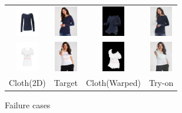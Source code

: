 \begin{figure}[t]
   \centering
\begin{tabular}{cccc}

\includegraphics[width=1cm]{figures/c2dw/000118_1.png}&
\includegraphics[width=1cm]{figures/image/000118_0.jpg}&
\includegraphics[width=1cm]{figures/c3dwfull/000118_1_000118_0.png}&
\includegraphics[width=1cm]{figures/try-on/000118_1_000118_0.jpg}\\

\includegraphics[width=1cm]{figures/c2dw/004508_1.png}&
\includegraphics[width=1cm]{figures/image/004508_0.jpg}&
\includegraphics[width=1cm]{figures/c3dwfull/004508_1_004508_0.png}&
\includegraphics[width=1cm]{figures/try-on/004508_1_004508_0.jpg}\\

Cloth(2D)&Target&Cloth(Warped)&Try-on\\

\end{tabular}

    \caption{Failure cases}
    \label{fig:clothtransfertryon}
    
\end{figure}



